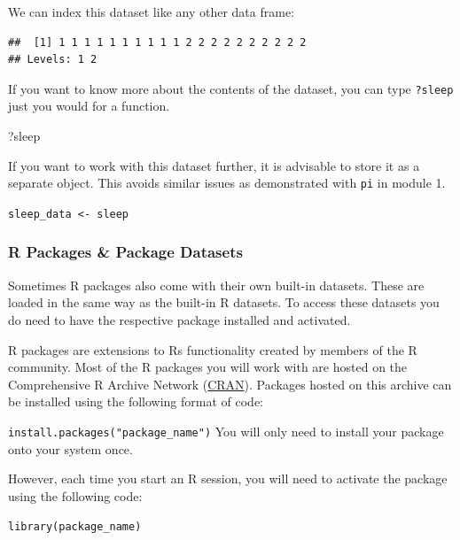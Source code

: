\documentclass[
]{book}
\newenvironment{Shaded}{\begin{snugshade}}{\end{snugshade}}
\newcommand{\NormalTok}[1]{#1}
\newcommand{\SpecialCharTok}[1]{\textcolor[rgb]{0.81,0.36,0.00}{\textbf{#1}}}
\begin{document}
We can index this dataset like any other data frame:

\begin{Shaded}
\end{Shaded}

\begin{verbatim}
##  [1] 1 1 1 1 1 1 1 1 1 1 2 2 2 2 2 2 2 2 2 2
## Levels: 1 2
\end{verbatim}

If you want to know more about the contents of the dataset, you can type \texttt{?sleep} just you would for a function.

\begin{Shaded}
\begin{Highlighting}[]
\NormalTok{?sleep}
\end{Highlighting}
\end{Shaded}

If you want to work with this dataset further, it is advisable to store it as a separate object. This avoids similar issues as demonstrated with \texttt{pi} in module 1.

\texttt{sleep\_data\ \textless{}-\ sleep}

\subsubsection{R Packages \& Package Datasets}\label{r-packages-package-datasets}

Sometimes R packages also come with their own built-in datasets. These are loaded in the same way as the built-in R datasets. To access these datasets you do need to have the respective package installed and activated.

R packages are extensions to Rs functionality created by members of the R community. Most of the R packages you will work with are hosted on the Comprehensive R Archive Network (\ul{CRAN}). Packages hosted on this archive can be installed using the following format of code:

\texttt{install.packages("package\_name")} You will only need to install your package onto your system once.

However, each time you start an R session, you will need to activate the package using the following code:

\texttt{library(package\_name)}
\end{document}
